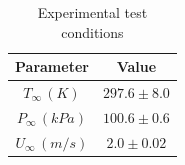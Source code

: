 \documentclass[preprint,12pt]{elsarticle}
\begin{document}

%
%
\begin{table}[!t!b!p]
\begin{center}
\begin{tabular}{ c c }
\hline
Parameter    & Value \\ \hline
$T_{\infty} \, (K) $ & $297.6\pm8.0$ \\
$P_{\infty} \, (kPa) $ & $100.6\pm0.6$ \\ 
$U_{\infty} \, (m/s) $ & $2.0\pm0.02$ \\ \hline
\end{tabular}
\caption{Experimental test conditions}
\label{tab:ETjet}
\end{center}
\end{table}
%
\end{document}
